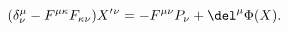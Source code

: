 \begin{equation} (\delta^{\mu}_{\nu}-F^{\mu\kappa}F_{\kappa\nu})X'{}^{\nu}
=-F^{\mu\nu}P_{\nu}+\del^{\mu}\Phi(X).
\end{equation}

